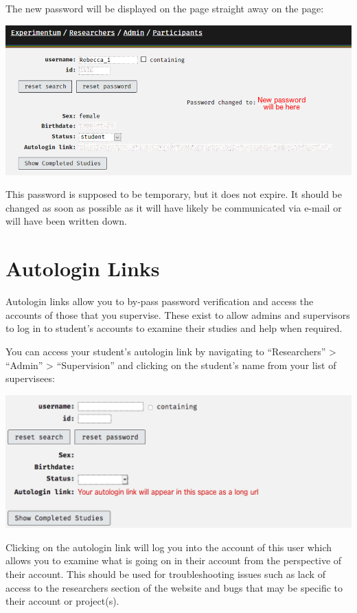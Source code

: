 \documentclass[]{book}
\begin{document}
The new password will be displayed on the page straight away on the page:

\includegraphics{images/screenshots/reset_password.png}

\begin{danger}
This password is supposed to be temporary, but it does not expire. It
should be changed as soon as possible as it will have likely be
communicated via e-mail or will have been written down.
\end{danger}

\hypertarget{autologin-links}{%
\section*{Autologin Links}\label{autologin-links}}

Autologin links allow you to by-pass password verification and access the accounts of those that you supervise. These exist to allow admins and supervisors to log in to student's accounts to examine their studies and help when required.

You can access your student's autologin link by navigating to ``Researchers'' \textgreater{} ``Admin'' \textgreater{} ``Supervision'' and clicking on the student's name from your list of supervisees:

\includegraphics{images/screenshots/autologin.png}

Clicking on the autologin link will log you into the account of this user which allows you to examine what is going on in their account from the perspective of their account. This should be used for troubleshooting issues such as lack of access to the researchers section of the website and bugs that may be specific to their account or project(s).
\end{document}
